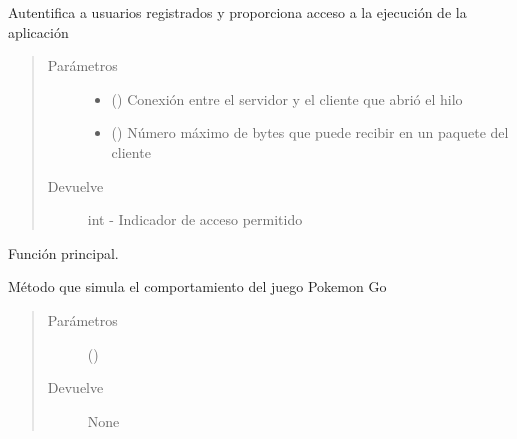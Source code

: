 \documentclass[letterpaper,10pt,spanish,openany,oneside]{sphinxmanual}
\begin{document}
\begin{fulllineitems}
\label{\detokenize{server:server.giveAccess}}
Autentifica a usuarios registrados y proporciona acceso a la ejecución de la aplicación
\begin{quote}\begin{description}
\item[{Parámetros}] \leavevmode\begin{itemize}
\item {} 
 () \textendash{} Conexión entre el servidor y el cliente que abrió el hilo

\item {} 
 () \textendash{} Número máximo de bytes que puede recibir en un paquete del cliente

\end{itemize}

\item[{Devuelve}] \leavevmode
int - Indicador de acceso permitido

\end{description}\end{quote}

\end{fulllineitems}


\begin{fulllineitems}
\label{\detokenize{server:server.main}}
Función principal.

\end{fulllineitems}


\begin{fulllineitems}
\label{\detokenize{server:server.playPokemonGo}}
Método que simula el comportamiento del juego Pokemon Go
\begin{quote}\begin{description}
\item[{Parámetros}] \leavevmode
{} () \textendash{} 

\item[{Devuelve}] \leavevmode
None

\end{description}\end{quote}

\end{fulllineitems}
\end{document}

